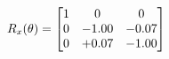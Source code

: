 \documentclass[preview]{standalone}
\begin{document}
\begin{align*}
\special{dvisvgm:raw <g id='unique000'>}R_{x}(\theta) = \begin{bmatrix}1 & 0 & 0 \\0 & -1.00 & -0.07 \\0 & +0.07 & -1.00\end{bmatrix}\special{dvisvgm:raw </g>}
\end{align*}
\end{document}
